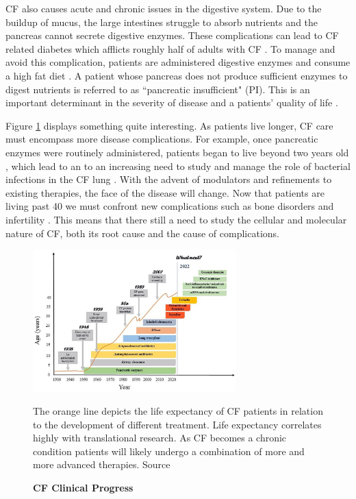 CF also causes acute and chronic issues in the digestive system. Due to the buildup of mucus, the large intestines struggle to absorb nutrients and the pancreas cannot secrete digestive enzymes. These complications can lead to CF related diabetes which afflicts roughly half of adults with CF \cite{Kayani2018}. To manage and avoid this complication, patients are administered digestive enzymes and consume a high fat diet \cite{sullivan2017}. A patient whose pancreas does not produce sufficient enzymes to digest nutrients is referred to as ``pancreatic insufficient" (PI). This is an important determinant in the severity of disease and a patients' quality of life \cite{halloran2011,singh2017}. 

Figure \ref{CF_life_expectancy} displays something quite interesting. As patients live longer, CF care must encompass more disease complications. For example, once pancreatic enzymes were routinely administered, patients began to live beyond two years old \cite{roberts1957, levy2011}, which lead to an to an increasing need to study and manage the role of bacterial infections in the CF lung \cite{burns2001}. With the advent of modulators and refinements to existing therapies, the face of the disease will change. Now that patients are living past 40 we must confront new complications such as bone disorders and infertility \cite{stalvey2013, popli2007}. This means that there still a need to study the cellular and molecular nature of CF, both its root cause and the cause of complications. 

\begin{figure}
	\label{CF_life_expectancy}
	\begin{center}
	\includegraphics[width=0.7\textwidth]{figures/CF_life_expectancy.png}
	\end{center}
	\captionsetup{singlelinecheck = false, justification=raggedright}
	\caption[CF Clinical Progress] {\textbf{CF Clinical Progress}}{The orange line depicts the life expectancy of CF patients in relation to the development of different treatment. Life expectancy correlates highly with translational research. As CF becomes a chronic condition patients will likely undergo a combination of more and more advanced therapies. Source \cite{garcia2022}} 
\end{figure}


